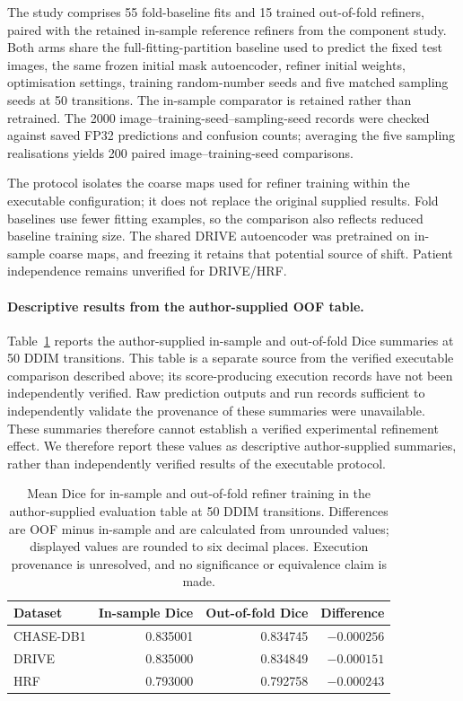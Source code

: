 \documentclass[jimaging,article,submit,pdftex,moreauthors]{Definitions/mdpi}%
\begin{document}
The study comprises 55 fold-baseline fits and 15 trained out-of-fold refiners, paired with the retained in-sample reference refiners from the component study. Both arms share the full-fitting-partition baseline used to predict the fixed test images, the same frozen initial mask autoencoder, refiner initial weights, optimisation settings, training random-number seeds and five matched sampling seeds at 50 transitions. The in-sample comparator is retained rather than retrained. The 2000 image--training-seed--sampling-seed records were checked against saved FP32 predictions and confusion counts; averaging the five sampling realisations yields 200 paired image--training-seed comparisons.

The protocol isolates the coarse maps used for refiner training within the executable configuration; it does not replace the original supplied results. Fold baselines use fewer fitting examples, so the comparison also reflects reduced baseline training size. The shared DRIVE autoencoder was pretrained on in-sample coarse maps, and freezing it retains that potential source of shift. Patient independence remains unverified for DRIVE/HRF.


\paragraph{Descriptive results from the author-supplied OOF table.}
Table~\ref{tab:author_oof_results} reports the author-supplied in-sample and out-of-fold Dice summaries at 50 DDIM transitions. This table is a separate source from the verified executable comparison described above; its score-producing execution records have not been independently verified. Raw prediction outputs and run records sufficient to independently validate the provenance of these summaries were unavailable. These summaries therefore cannot establish a verified experimental refinement effect. We therefore report these values as descriptive author-supplied summaries, rather than independently verified results of the executable protocol.

\begin{table}[htbp]
\centering
\caption{Mean Dice for in-sample and out-of-fold refiner training in the author-supplied evaluation table at 50 DDIM transitions. Differences are OOF minus in-sample and are calculated from unrounded values; displayed values are rounded to six decimal places. Execution provenance is unresolved, and no significance or equivalence claim is made.}
\label{tab:author_oof_results}
\begin{tabular}{lrrr}
\toprule
Dataset & In-sample Dice & Out-of-fold Dice & Difference \\
\midrule
CHASE-DB1 & 0.835001 & 0.834745 & $-0.000256$ \\
DRIVE & 0.835000 & 0.834849 & $-0.000151$ \\
HRF & 0.793000 & 0.792758 & $-0.000243$ \\
\bottomrule
\end{tabular}
\end{table}
\end{document}
